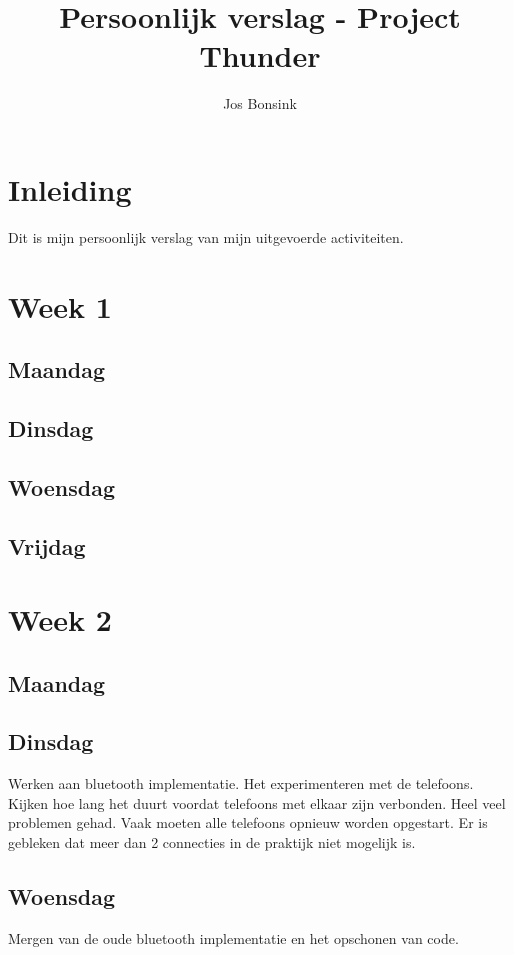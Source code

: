 \documentclass[12pt]{article}
\author{Jos Bonsink}
\begin{document}
\title{Persoonlijk verslag - Project Thunder}
\maketitle

\section*{Inleiding}
Dit is mijn persoonlijk verslag van mijn uitgevoerde activiteiten.

\section*{Week 1}
\subsection*{Maandag}


\subsection*{Dinsdag}


\subsection*{Woensdag}


\subsection*{Vrijdag}


\section*{Week 2}
\subsection*{Maandag}
\subsection*{Dinsdag}
Werken aan bluetooth implementatie. Het experimenteren met de telefoons. Kijken hoe lang het duurt voordat telefoons met elkaar zijn verbonden. Heel veel problemen gehad. Vaak moeten alle telefoons opnieuw worden opgestart. Er is gebleken dat meer dan 2 connecties in de praktijk niet mogelijk is.

\subsection*{Woensdag}
Mergen van de oude bluetooth implementatie en het opschonen van code.
\end{document}
